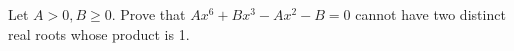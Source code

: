 Let $A>0,B\ge0$. Prove that $Ax^6+Bx^3-Ax^2-B=0$ cannot have two distinct real roots whose product is 1.
